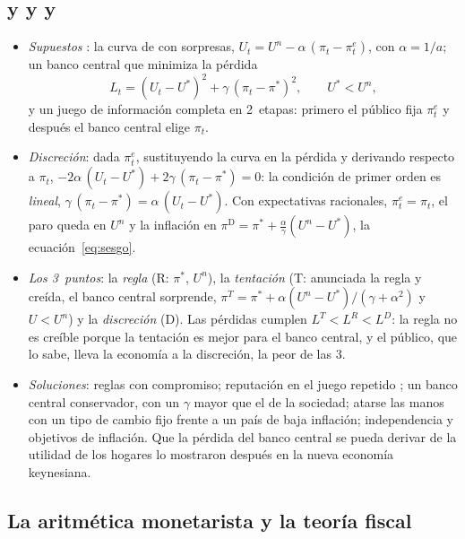 \documentclass[11pt]{article}
\begin{document}
\subsection{ y  y  y }\label{anexo:barro-gordon}

\begin{itemize}
\item \emph{Supuestos}\nocite{KydlandPrescott1977Rules,BarroGordon1983Positive} : la curva de  con sorpresas, $U_t=U^n-\alpha\,(\pi_t-\pi^e_t)$, con $\alpha=1/a$; un banco central que minimiza la pérdida
  \begin{equation*}
  L_t=(U_t-U^*)^2+\gamma\,(\pi_t-\pi^*)^2,\qquad U^*<U^n,
  \end{equation*}
  y un juego de información completa en 2~etapas: primero el público fija $\pi^e_t$ y después el banco central elige $\pi_t$.
\item \emph{Discreción}: dada $\pi^e_t$, sustituyendo la curva en la pérdida y derivando respecto a $\pi_t$, $-2\alpha\,(U_t-U^*)+2\gamma\,(\pi_t-\pi^*)=0$: la condición de primer orden es \emph{lineal}, $\gamma\,(\pi_t-\pi^*)=\alpha\,(U_t-U^*)$. Con expectativas racionales, $\pi^e_t=\pi_t$, el paro queda en $U^n$ y la inflación en $\pi^{\mathrm D}=\pi^*+\frac{\alpha}{\gamma}(U^n-U^*)$, la ecuación~\eqref{eq:sesgo}.
\item \emph{Los 3~puntos}: la \emph{regla} (R: $\pi^*$, $U^n$), la \emph{tentación} (T: anunciada la regla y creída, el banco central sorprende, $\pi^T=\pi^*+\alpha(U^n-U^*)/(\gamma+\alpha^2)$ y $U<U^n$) y la \emph{discreción} (D). Las pérdidas cumplen $L^T<L^R<L^D$: la regla no es creíble porque la tentación es mejor para el banco central, y el público, que lo sabe, lleva la economía a la discreción, la peor de las 3.
\item \emph{Soluciones}: reglas con compromiso; reputación en el juego repetido ; un banco central conservador, con un $\gamma$ mayor que el de la sociedad\nocite{Rogoff1985Optimal}; atarse las manos con un tipo de cambio fijo frente a un país de baja inflación\nocite{GiavazziPagano1988Advantage}; independencia y objetivos de inflación. Que la pérdida del banco central se pueda derivar de la utilidad de los hogares lo mostraron después \textcite{RotembergWoodford1997Optimization} en la nueva economía keynesiana.
\end{itemize}

\subsection{La aritmética monetarista y la teoría fiscal}\label{anexo:fiscal}
\end{document}
